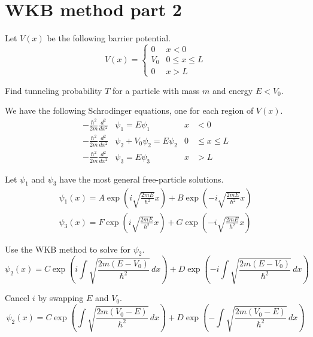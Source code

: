 


\section*{WKB method part 2}

Let $V(x)$ be the following barrier potential.
\begin{equation*}
V(x)=\begin{cases}
0 & x<0
\\
V_0 & 0\le x\le L
\\
0 & x>L
\end{cases}
\end{equation*}

Find tunneling probability $T$ for a particle with mass $m$ and energy $E<V_0$.

\bigskip
We have the following Schrodinger equations, one for each region of $V(x)$.
\begin{align*}
-\frac{\hbar^2}{2m}\frac{d^2}{dx^2}&\psi_1=E\psi_1 & x&<0
\\[1ex]
-\frac{\hbar^2}{2m}\frac{d^2}{dx^2}&\psi_2+V_0\psi_2=E\psi_2 & 0&\le x\le L
\\[1ex]
-\frac{\hbar^2}{2m}\frac{d^2}{dx^2}&\psi_3=E\psi_3 & x&>L
\end{align*}

Let $\psi_1$ and $\psi_3$ have the most general
free-particle solutions.
\begin{align*}
\psi_1(x)=A\exp\left(i\sqrt{\frac{2mE}{\hbar^2}}x\right)
+B\exp\left(-i\sqrt{\frac{2mE}{\hbar^2}}x\right)
\\
\psi_3(x)=F\exp\left(i\sqrt{\frac{2mE}{\hbar^2}}x\right)
+G\exp\left(-i\sqrt{\frac{2mE}{\hbar^2}}x\right)
\end{align*}

Use the WKB method to solve for $\psi_2$.
\begin{equation*}
\psi_2(x)=
C\exp\left(i\int\sqrt{\frac{2m(E-V_0)}{\hbar^2}}\,dx\right)
+D\exp\left(-i\int\sqrt{\frac{2m(E-V_0)}{\hbar^2}}\,dx\right)
\end{equation*}

Cancel $i$ by swapping $E$ and $V_0$.
\begin{equation*}
\psi_2(x)=
C\exp\left(\int\sqrt{\frac{2m(V_0-E)}{\hbar^2}}\,dx\right)
+D\exp\left(-\int\sqrt{\frac{2m(V_0-E)}{\hbar^2}}\,dx\right)
\end{equation*}

